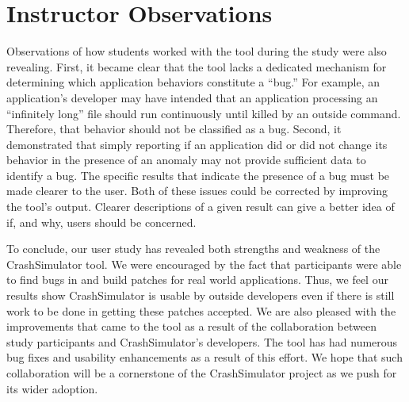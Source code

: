 \section{Instructor Observations}
\label{subsec:tool-shortcomings}
Observations of how students worked  with the tool during the study were also revealing.
First,
it became clear that the tool
lacks a dedicated mechanism
for determining
which application behaviors constitute a ``bug.''
For example, an application's developer
may have intended that an application processing an ``infinitely long'' file should run continuously
until killed by an outside command.
Therefore, that behavior should not be classified as a bug.
Second,
it demonstrated that
simply reporting if an application did or did not change its behavior
in the presence of an anomaly may not provide sufficient data to identify a bug. The specific results that indicate the presence of a bug must be made clearer to the user.
Both of these issues could be corrected 
by improving the tool's output.
Clearer descriptions of a given result
can give a better idea of
if,
and why,
users should be concerned.

To conclude, our user study has revealed both strengths and weakness
of the CrashSimulator tool.
We were encouraged by the fact that participants were able to find bugs in and build patches for real world applications.
Thus, we feel our results show CrashSimulator is usable by outside developers even if there is still work to be done in getting these patches accepted. 
We are also pleased with the improvements that came to the tool as a result of the collaboration between study participants and CrashSimulator's developers.
The tool has had numerous bug fixes and usability enhancements as a result of this effort.
We hope that such collaboration will be a cornerstone of the CrashSimulator project as we push for its wider adoption.
